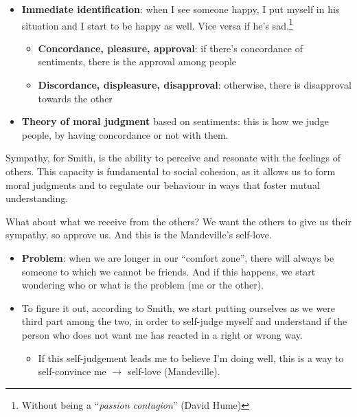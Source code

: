             \begin{itemize}
                \item \textbf{Immediate identification}: when I see someone happy, I put myself in his situation and I start to be happy as well. Vice versa if he’s sad.\footnote{Without being a “\textit{passion contagion}” (David Hume)} 
                \begin{itemize}
                    \item \textbf{Concordance, pleasure, approval}: if there’s concordance of sentiments, there is the approval among people
                    \item \textbf{Discordance, displeasure, disapproval}: otherwise, there is disapproval towards the other
                \end{itemize}
                \item \textbf{Theory of moral judgment} based on sentiments: this is how we judge people, by having concordance or not with them.
            \end{itemize}

            \begin{remark}
                Sympathy, for Smith, is the ability to perceive and resonate with the feelings of others. This capacity is fundamental to social cohesion, as it allows us to form moral judgments and to regulate our behaviour in ways that foster mutual understanding.
            \end{remark}

            What about what we receive from the others? We want the others to give us their sympathy, so approve us. And this is the Mandeville’s self-love. 
            
            \begin{itemize}
                \item \textbf{Problem}: when we are longer in our “comfort zone”, there will always be someone to which we cannot be friends. And if this happens, we start wondering who or what is the problem (me or the other).
                \item To figure it out, according to Smith, we start putting ourselves as we were third part among the two, in order to self-judge myself and understand if the person who does not want me has reacted in a right or wrong way. 
                \begin{itemize}
                    \item If this self-judgement leads me to believe I’m doing well, this is a way to self-convince me \(\rightarrow\) self-love (Mandeville).
                \end{itemize}
            \end{itemize}

